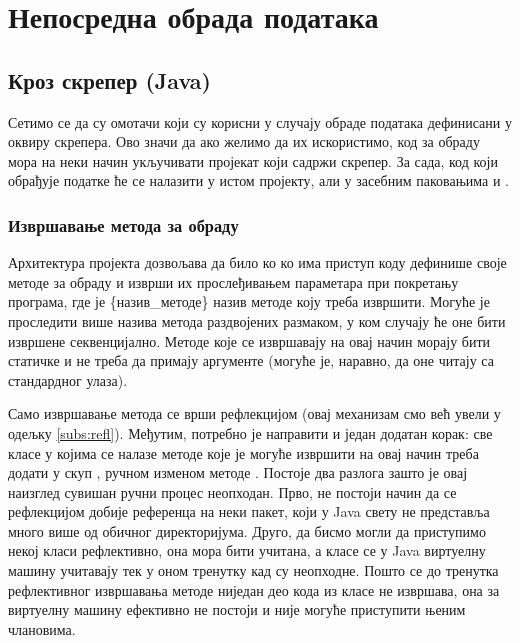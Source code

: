 \chapter{Непосредна обрада података}\label{ch:\thechapter}

\section{Кроз скрепер (Java)}

Сетимо се да су омотачи који су корисни у случају обраде података дефинисани у оквиру скрепера. Ово значи да ако желимо да их искористимо, код за обраду мора на неки начин укључивати пројекат који садржи скрепер. За сада, код који обрађује податке ће се налазити у истом пројекту, али у засебним паковањима  и .

\subsection{Извршавање метода за обраду}

Архитектура пројекта дозвољава да било ко ко има приступ коду дефинише своје методе за обраду и изврши их прослеђивањем параметара  при покретању програма, где је \{назив\_методе\} назив методе коју треба извршити. Могуће је проследити више назива метода раздвојених размаком, у ком случају ће оне бити извршене секвенцијално. Методе које се извршавају на овај начин морају бити статичке и не треба да примају аргументе (могуће је, наравно, да оне читају са стандардног улаза).

Само извршавање метода се врши рефлекцијом (овај механизам смо већ увели у одељку \ref{subs:refl}). Међутим, потребно је направити и један додатан корак: све класе у којима се налазе методе које је могуће извршити на овај начин треба додати у скуп , ручном изменом методе . Постоје два разлога зашто је овај наизглед сувишан ручни процес неопходан. Прво, не постоји начин да се рефлекцијом добије референца на неки пакет, који у Java свету не представља много више од обичног директоријума. Друго, да бисмо могли да приступимо некој класи рефлективно, она мора бити учитана, а класе се у Java виртуелну машину учитавају тек у оном тренутку кад су неопходне. Пошто се до тренутка рефлективног извршавања методе ниједан део кода из класе не извршава, она за виртуелну машину ефективно не постоји и није могуће приступити њеним члановима.

